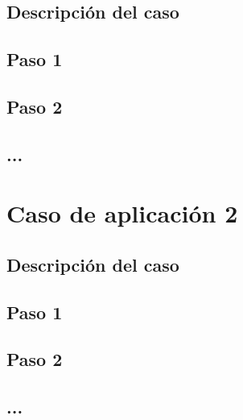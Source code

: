 \documentclass{GVT_CONAE_Class}
\begin{document}
    \subsection{Descripción del caso}
    
    \subsection{Paso 1}
        
    \subsection{Paso 2}
    
    \subsection{...}



\section{Caso de aplicación 2}

    \subsection{Descripción del caso}
    
    \subsection{Paso 1}
        
    \subsection{Paso 2}
    
    \subsection{...}






\newpage %
\appendix
\end{document}
